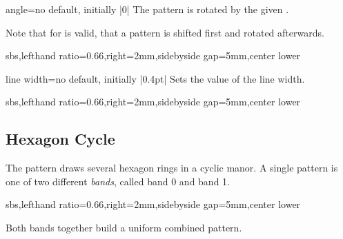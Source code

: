 \documentclass[a4paper,11pt]{article}
\begin{document}
\begin{myvoid}
\begin{docPatternKey}[][doc label=angle@hexgrid]{angle}{=}{no default, initially |0|}
  The pattern is rotated by the given .
  \par
  Note that for  is valid, that a pattern is shifted first and rotated afterwards.
\begin{dispExample*}{sbs,lefthand ratio=0.66,right=2mm,sidebyside gap=5mm,center lower}
\end{dispExample*}
\end{docPatternKey}



\begin{docPatternKey}[][doc label=line width@hexgrid]{line width}{=}{no default, initially |0.4pt|}
  Sets the  value of the line width.
\begin{dispExample*}{sbs,lefthand ratio=0.66,right=2mm,sidebyside gap=5mm,center lower}
\end{dispExample*}
\end{docPatternKey}


\clearpage
\subsection{Hexagon Cycle}
The  pattern draws several hexagon rings in a cyclic manor.
A single pattern is one of two different \emph{bands}, called band 0 and band 1.

\begin{dispExample*}{sbs,lefthand ratio=0.66,right=2mm,sidebyside gap=5mm,center lower}
\end{dispExample*}

Both bands together build a uniform combined pattern.


\end{myvoid}
\end{document}
